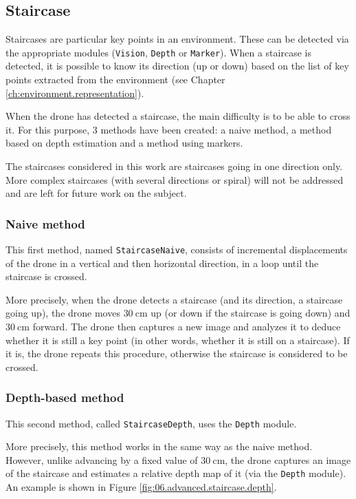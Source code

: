 \subsection{Staircase}

Staircases are particular key points in an environment. These can be detected via the appropriate modules (\texttt{Vision}, \texttt{Depth} or \texttt{Marker}). When a staircase is detected, it is possible to know its direction (up or down) based on the list of key points extracted from the environment (see Chapter \ref{ch:environment.representation}).

When the drone has detected a staircase, the main difficulty is to be able to cross it. For this purpose, $3$ methods have been created: a naive method, a method based on depth estimation and a method using markers.

\begin{note}
    The staircases considered in this work are staircases going in one direction only. More complex staircases (with several directions or spiral) will not be addressed and are left for future work on the subject.
\end{note}

\subsubsection{Naive method}

This first method, named \texttt{StaircaseNaive}, consists of incremental displacements of the drone in a vertical and then horizontal direction, in a loop until the staircase is crossed.

More precisely, when the drone detects a staircase (and its direction, \eg{} a staircase going up), the drone moves $\SI{30}{\centi\meter}$ up (or down if the staircase is going down) and $\SI{30}{\centi\meter}$ forward. The drone then captures a new image and analyzes it to deduce whether it is still a key point (in other words, whether it is still on a staircase). If it is, the drone repeats this procedure, otherwise the staircase is considered to be crossed.

\subsubsection{Depth-based method}

This second method, called \texttt{StaircaseDepth}, uses the \texttt{Depth} module.

More precisely, this method works in the same way as the naive method. However, unlike advancing by a fixed value of $\SI{30}{\centi\meter}$, the drone captures an image of the staircase and estimates a relative depth map of it (via the \texttt{Depth} module). An example is shown in Figure \ref{fig:06.advanced.staircase.depth}.

